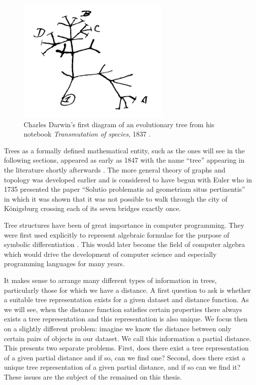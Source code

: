 \begin{figure}
  \centering
  \includegraphics[width=20em]{figures/background2/darwin-tree.png}
  \caption{Charles Darwin's first diagram of an evolutionary tree from his
    notebook \textit{Transmutation of species}, 1837 \cite{darwin1837notebook}.}
  \label{fig:darwin-tree}
\end{figure}

Trees as a formally defined mathematical entity, such as the ones will see in
the following sections, appeared as early as 1847 with the name ``tree''
appearing in the literature shortly afterwards \cite{knuth97taocp1}.  The more
general theory of graphs and topology was developed earlier and is considered
to have begun with Euler who in 1735 presented the paper ``Solutio problematis
ad geometriam situs pertinentis'' \cite{euler1735solutio} in which it was
shown that it was not possible to walk through the city of Königsburg crossing
each of its seven bridges exactly once.

Tree structures have been of great importance in computer programming.  They
were first used explicitly to represent algebraic formulae for the purpose of
symbolic differentiation \citep{kahrimanian53differentiation}.  This would
later become the field of computer algebra which would drive the development
of computer science and especially programming languages for many years.

It makes sense to arrange many different types of information in trees,
particularly those for which we have a distance.  A first question to ask is
whether a suitable tree representation exists for a given dataset and distance
function.  As we will see, when the distance function satisfies certain
properties there always exists a tree representation and this representation
is also unique.  We focus then on a slightly different problem: imagine we
know the distance between only certain pairs of objects in our dataset.  We
call this information a partial distance.  This presents two separate
problems.  First, does there exist a tree representation of a given partial
distance and if so, can we find one?  Second, does there exist a unique tree
representation of a given partial distance, and if so can we find it?  These
issues are the subject of the remained on this thesis.

